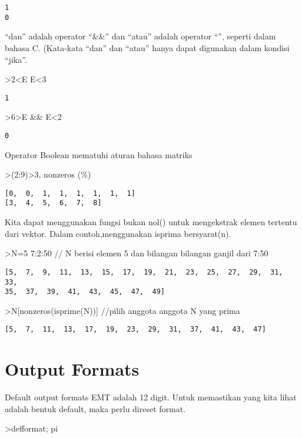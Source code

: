 \documentclass[
]{book}
\begin{document}
\begin{verbatim}
1
0
\end{verbatim}

``dan'' adalah operator ``\&\&'' dan ``atau'' adalah operator ``\textbar\textbar{}'', seperti dalam bahasa C. (Kata-kata ``dan'' dan ``atau'' hanya dapat digunakan dalam kondisi ``jika''.

\textgreater2\textless E \textbar\textbar{} E\textless3

\begin{verbatim}
1
\end{verbatim}

\textgreater6\textgreater E \&\& E\textless2

\begin{verbatim}
0
\end{verbatim}

Operator Boolean mematuhi aturan bahasa matriks

\textgreater(2:9)\textgreater3, nonzeros (\%)

\begin{verbatim}
[0,  0,  1,  1,  1,  1,  1,  1]
[3,  4,  5,  6,  7,  8]
\end{verbatim}

Kita dapat menggunakan fungsi bukan nol() untuk mengekstrak elemen tertentu dari vektor. Dalam contoh,menggunakan isprima bersyarat(n).

\textgreater N=5 \textbar{} 7:2:50 // N berisi elemen 5 dan bilangan bilangan ganjil dari 7:50

\begin{verbatim}
[5,  7,  9,  11,  13,  15,  17,  19,  21,  23,  25,  27,  29,  31,  33,
35,  37,  39,  41,  43,  45,  47,  49]
\end{verbatim}

\textgreater N{[}nonzeros(isprime(N)){]} //pilih anggota anggota N yang prima

\begin{verbatim}
[5,  7,  11,  13,  17,  19,  23,  29,  31,  37,  41,  43,  47]
\end{verbatim}

\section{Output Formats}\label{output-formats}

Default output formats EMT adalah 12 digit. Untuk memastikan yang kita lihat adalah bentuk default, maka perlu direset format.

\textgreater defformat; pi
\end{document}
